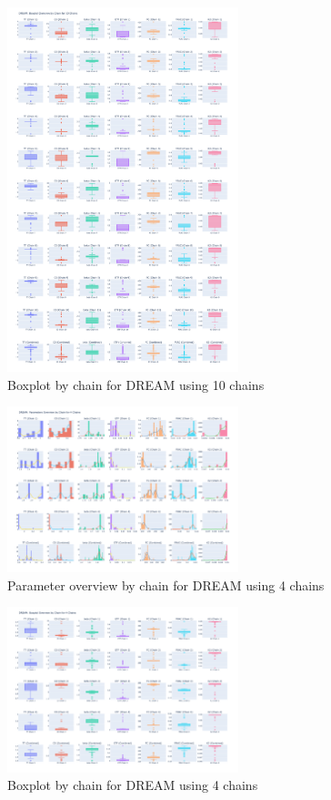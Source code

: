 \begin{figure}[H]
    \centering
    \includegraphics[width=0.6\textwidth]{figures/dream/boxplot_10.png}
    \captionsetup{width=.8\textwidth}
    \caption{Boxplot by chain for DREAM using 10 chains}
    \label{fig:enter-label}
\end{figure}

\begin{figure}[H]
    \centering
    \includegraphics[width=0.6\textwidth]{figures/dream/param_overview_4.png}
    \captionsetup{width=.8\textwidth}
    \caption{Parameter overview by chain for DREAM using 4 chains}
    \label{fig:enter-label}
\end{figure}

\begin{figure}[H]
    \centering
    \includegraphics[width=0.6\textwidth]{figures/dream/boxplot_4.png}
    \captionsetup{width=.8\textwidth}
    \caption{Boxplot by chain for DREAM using 4 chains}
    \label{fig:enter-label}
\end{figure}

